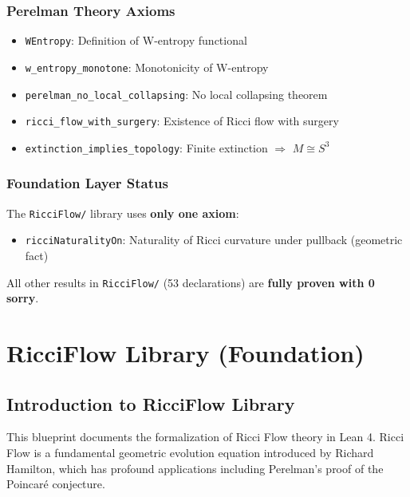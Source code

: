 \section{Perelman Theory Axioms}
\begin{itemize}
\item \texttt{WEntropy}: Definition of W-entropy functional
\item \texttt{w\_entropy\_monotone}: Monotonicity of W-entropy
\item \texttt{perelman\_no\_local\_collapsing}: No local collapsing theorem
\item \texttt{ricci\_flow\_with\_surgery}: Existence of Ricci flow with surgery
\item \texttt{extinction\_implies\_topology}: Finite extinction $\Rightarrow$ $M \cong S^3$
\end{itemize}

\section{Foundation Layer Status}

The \texttt{RicciFlow/} library uses \textbf{only one axiom}:
\begin{itemize}
\item \texttt{ricciNaturalityOn}: Naturality of Ricci curvature under pullback (geometric fact)
\end{itemize}

All other results in \texttt{RicciFlow/} (53 declarations) are \textbf{fully proven with 0 sorry}.


\part{RicciFlow Library (Foundation)}
\label{part:ricciflow}

\chapter{Introduction to RicciFlow Library}

This blueprint documents the formalization of Ricci Flow theory in Lean 4.
Ricci Flow is a fundamental geometric evolution equation introduced by Richard Hamilton,
which has profound applications including Perelman's proof of the Poincaré conjecture.

